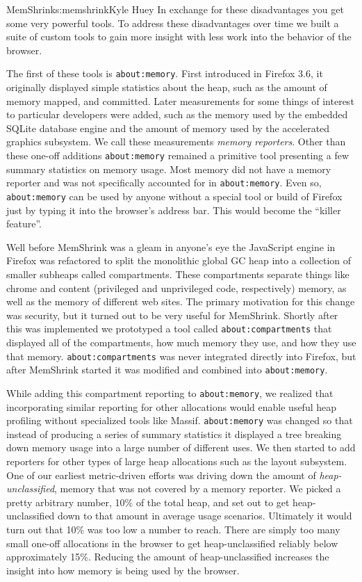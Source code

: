 \begin{aosachapter}{MemShrink}{s:memshrink}{Kyle Huey}
In exchange for these disadvantages you get some very powerful tools. To
address these disadvantages over time we built a suite of custom tools
to gain more insight with less work into the behavior of the browser.

The first of these tools is \texttt{about:memory}. First introduced in
Firefox 3.6, it originally displayed simple statistics about the heap,
such as the amount of memory mapped, and committed. Later measurements
for some things of interest to particular developers were added, such as
the memory used by the embedded SQLite database engine and the amount of
memory used by the accelerated graphics subsystem. We call these
measurements \emph{memory reporters}. Other than these one-off additions
\texttt{about:memory} remained a primitive tool presenting a few summary
statistics on memory usage. Most memory did not have a memory reporter
and was not specifically accounted for in \texttt{about:memory}. Even
so, \texttt{about:memory} can be used by anyone without a special tool
or build of Firefox just by typing it into the browser's address bar.
This would become the ``killer feature''.

Well before MemShrink was a gleam in anyone's eye the JavaScript engine
in Firefox was refactored to split the monolithic global GC heap into a
collection of smaller subheaps called compartments. These compartments
separate things like chrome and content (privileged and unprivileged
code, respectively) memory, as well as the memory of different web
sites. The primary motivation for this change was security, but it
turned out to be very useful for MemShrink. Shortly after this was
implemented we prototyped a tool called \texttt{about:compartments} that
displayed all of the compartments, how much memory they use, and how
they use that memory. \texttt{about:compartments} was never integrated
directly into Firefox, but after MemShrink started it was modified and
combined into \texttt{about:memory}.

While adding this compartment reporting to \texttt{about:memory}, we
realized that incorporating similar reporting for other allocations
would enable useful heap profiling without specialized tools like
Massif. \texttt{about:memory} was changed so that instead of producing a
series of summary statistics it displayed a tree breaking down memory
usage into a large number of different uses. We then started to add
reporters for other types of large heap allocations such as the layout
subsystem. One of our earliest metric-driven efforts was driving down
the amount of \emph{heap-unclassified}, memory that was not covered by a
memory reporter. We picked a pretty arbitrary number, 10\% of the total
heap, and set out to get heap-unclassified down to that amount in
average usage scenarios. Ultimately it would turn out that 10\% was too
low a number to reach. There are simply too many small one-off
allocations in the browser to get heap-unclassified reliably below
approximately 15\%. Reducing the amount of heap-unclassified increases
the insight into how memory is being used by the browser.


\end{aosachapter}
